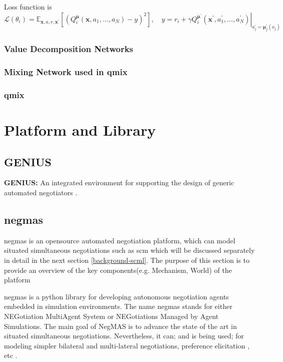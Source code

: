 Loss function is 
\begin{equation}
\mathcal{L}\left(\theta_{i}\right)=\mathbb{E}_{\mathbf{x}, a, r, \mathbf{x}^{\prime}}\left[\left(Q_{i}^{\boldsymbol{\mu}}\left(\mathbf{x}, a_{1}, \ldots, a_{N}\right)-y\right)^{2}\right], \quad y=r_{i}+\left.\gamma Q_{i}^{\boldsymbol{\mu}^{\prime}}\left(\mathbf{x}^{\prime}, a_{1}^{\prime}, \ldots, a_{N}^{\prime}\right)\right|_{a_{j}^{\prime}=\boldsymbol{\mu}_{j}^{\prime}\left(o_{j}\right)}
\end{equation}

\subsubsection{Value Decomposition Networks}

\subsubsection{Mixing Network used in \gls{qmix}}

\subsubsection{\gls{qmix}}

\section{Platform and Library}
\subsection{GENIUS}
\textbf{GENIUS:} An integrated environment for supporting the design of generic automated negotiators \parencite{Lin2014}.

\subsection{\gls{negmas}} \label{background:negmas}
\gls{negmas} is an opensource automated negotiation platform, which can model situated simultaneous negotiations such as \gls{scm} which will be discussed separately in detail in the next section \ref{background-scml}. The purpose of this section is to provide an overview of the key components(e.g. Mechanism, World) of the platform

\gls{negmas} is a python library for developing autonomous negotiation agents embedded in simulation environments. The name negmas stands for either NEGotiation MultiAgent System or NEGotiations Managed by Agent Simulations. The main goal of NegMAS is to advance the state of the art in situated simultaneous negotiations. Nevertheless, it can; and is being used; for modeling simpler bilateral and multi-lateral negotiations, preference elicitation , etc \parencite{Mohammad2019}.

